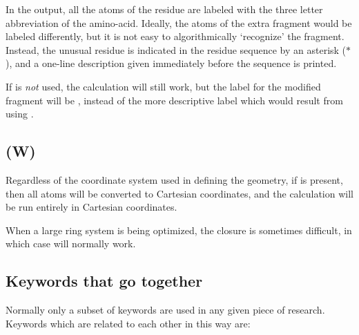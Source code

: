 In the output, all the atoms of the residue are labeled with the three
letter abbreviation of the amino-acid.  Ideally, the atoms of the extra
fragment would be labeled differently, but it is not easy to
algorithmically `recognize' the fragment.  Instead, the unusual residue
is indicated in the residue sequence  by an asterisk ($*$), and a
one-line description given immediately before the sequence is printed.

If  is {\em not} used, the calculation will still work, but
the label for the modified fragment will be , instead of the
more descriptive label which would result from using .

\subsection*{ (W)} 
   Regardless of the coordinate system used in defining the geometry,
   if  is present, then all atoms will be converted to
Cartesian coordinates, and the calculation will be run entirely in
Cartesian coordinates.

        When a large ring system is being optimized,  the closure  is sometimes
   difficult, in which case  will normally work.

\subsection{Keywords that go together}
 Normally only a subset of keywords are used in any  given  piece  of
 research.  Keywords which are related to each other in this way are:


